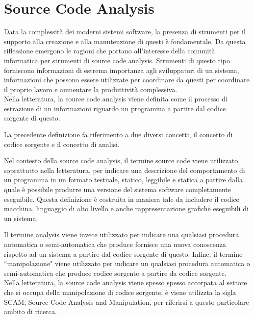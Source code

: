 \section{Source Code Analysis}

Data la complessità dei moderni sistemi software, la presenza di strumenti per
il supporto alla creazione e alla manutenzione di questi è fondamentale. Da
questa riflessione emergono le ragioni che portano all’interesse della comunità
informatica per strumenti di source code analysis. Strumenti di questo tipo
forniscono informazioni di estrema importanza agli sviluppatori di un sistema,
informazioni che possono essere utilizzate per coordinare da questi per
coordinare il proprio lavoro e aumentare la produttività complessiva.\\

Nella letteratura, la source code analysis viene definita come il processo di
estrazione di un informazioni riguardo un programma a partire dal codice
sorgente di questo.

La precedente definizione fa riferimento a due diversi concetti, il concetto di
codice sorgente e il concetto di analisi.

Nel contesto della source code analysis, il termine source code viene
utilizzato, soprattutto nella letteratura, per indicare una descrizione del
comportamento di un programma in un formato testuale, statico, leggibile e
statica a partire dalla quale è possibile produrre una versione del sistema
software completamente eseguibile. Questa definizione è costruita in maniera
tale da includere il codice macchina, linguaggio di alto livello e anche
rappresentazione grafiche eseguibili di un sistema.

Il termine analysis viene invece utilizzato per indicare una qualsiasi
procedura automatica o semi-automatica che produce fornisce una nuova
conoscenza rispetto ad un sistema a partire dal codice sorgente di questo.
Infine, il termine “manipolazione" viene utilizzato per indicare un qualsiasi
procedura automatica o semi-automatica che produce codice sorgente a partire da
codice sorgente. \cite{DBLP:journals/jss/DeanHKV06}
\cite{DBLP:conf/icse/Binkley07}\\

Nella letteratura, la source code analysis viene spesso spesso accorpata al
settore che si occupa della manipolazione di codice sorgente, è viene utilizzta
la sigla SCAM, Source Code Analysis and Manipulation, per riferirsi a questo
particolare ambito di ricerca. \cite{DBLP:conf/scam/2001}\\

